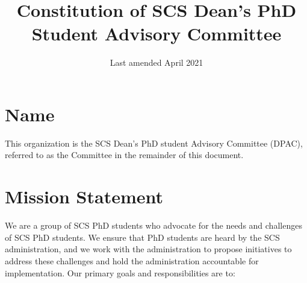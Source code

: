 \documentclass{article}
\title{Constitution of SCS Dean's PhD Student Advisory Committee}
\author{}
\date{Last amended April 2021}
\begin{document}
\setlength{\parskip}{1em}
\maketitle









\section{Name} \label{sec:name}
This organization is the SCS Dean's PhD student Advisory Committee (DPAC), referred to as the Committee in the remainder of this document. 

\section{Mission Statement} \label{sec:mission}

We are a group of SCS PhD students who advocate for the needs and challenges of SCS PhD students. We ensure that PhD students are heard by the SCS administration, and we work with the administration to propose initiatives to address these challenges and hold the administration accountable for implementation. Our primary goals and responsibilities are to:
\end{document}
